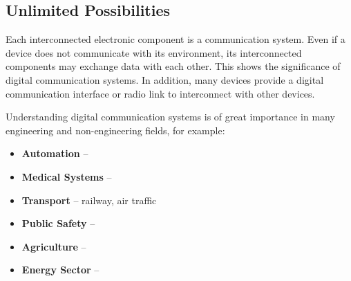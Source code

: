 \begin{refsection}
\section*{Unlimited Possibilities}

Each interconnected electronic component is a communication system. Even if a device does not communicate with its environment, its interconnected components may exchange data with each other. This shows the significance of digital communication systems. In addition, many devices provide a digital communication interface or radio link to interconnect with other devices.

Understanding digital communication systems is of great importance in many engineering and non-engineering fields, for example:
\begin{itemize}
	\item \textbf{Automation} -- 
	\item \textbf{Medical Systems} -- 
	\item \textbf{Transport} -- railway, air traffic
	\item \textbf{Public Safety} -- 
	\item \textbf{Agriculture} -- 
	\item \textbf{Energy Sector} -- 
\end{itemize}

\printbibliography[heading=subbibliography]
\end{refsection}
